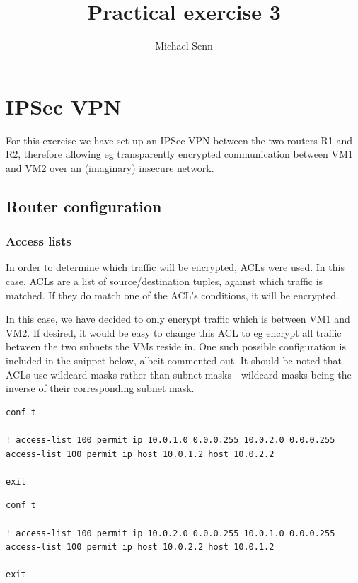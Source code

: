 \documentclass[a4paper]{scrreprt}
\title{Practical exercise 3}
\author{Michael Senn \maillink{michael.senn@students.unibe.ch}}
\date{\printdate}
\begin{document}
\maketitle


\chapter{IPSec VPN}

For this exercise we have set up an IPSec VPN between the two routers R1 and
R2, therefore allowing eg transparently encrypted communication between VM1 and
VM2 over an (imaginary) insecure network.

\section{Router configuration}

\subsection{Access lists}

In order to determine which traffic will be encrypted, ACLs were used. In this
case, ACLs are a list of source/destination tuples, against which traffic is
matched. If they do match one of the ACL's conditions, it will be encrypted.

In this case, we have decided to only encrypt traffic which is between VM1 and
VM2. If desired, it would be easy to change this ACL to eg encrypt all traffic
between the two subnets the VMs reside in. One such possible configuration is
included in the snippet below, albeit commented out. It should be noted that
ACLs use wildcard masks rather than subnet masks - wildcard masks being the
inverse of their corresponding subnet mask.

\begin{lstlisting}[caption=Router 1]
conf t

! access-list 100 permit ip 10.0.1.0 0.0.0.255 10.0.2.0 0.0.0.255
access-list 100 permit ip host 10.0.1.2 host 10.0.2.2

exit
\end{lstlisting}

\begin{lstlisting}[caption=Router 2]
conf t

! access-list 100 permit ip 10.0.2.0 0.0.0.255 10.0.1.0 0.0.0.255
access-list 100 permit ip host 10.0.2.2 host 10.0.1.2

exit
\end{lstlisting}
\end{document}
